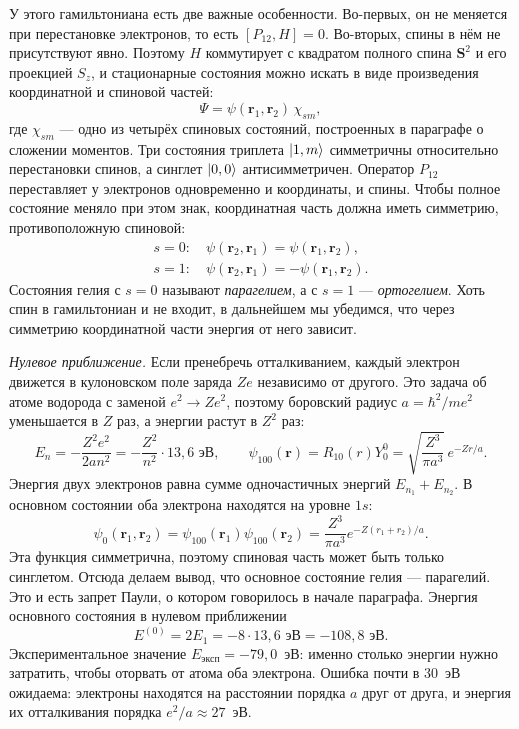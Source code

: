 У этого гамильтониана есть две важные особенности. Во-первых, он не меняется
при перестановке электронов, то есть $[P_{12}, H] = 0$. Во-вторых, спины в нём
не присутствуют явно. Поэтому $H$ коммутирует с квадратом полного спина
$\mathbf{S}^2$ и его проекцией $S_z$, и стационарные состояния можно искать в
виде произведения координатной и спиновой частей:
\[
  \Psi = \psi(\mathbf{r}_1, \mathbf{r}_2)\,\chi_{sm},
\]
где $\chi_{sm}$ --- одно из четырёх спиновых состояний, построенных в параграфе
о сложении моментов. Три состояния триплета $\lvert1, m\rangle$ симметричны
относительно перестановки спинов, а синглет $\lvert0, 0\rangle$ антисимметричен.
Оператор $P_{12}$ переставляет у электронов одновременно и координаты, и спины.
Чтобы полное состояние меняло при этом знак, координатная часть должна иметь
симметрию, противоположную спиновой:
\begin{gather*}
  s = 0:\quad \psi(\mathbf{r}_2, \mathbf{r}_1) = \psi(\mathbf{r}_1, \mathbf{r}_2),\\
  s = 1:\quad \psi(\mathbf{r}_2, \mathbf{r}_1) = -\psi(\mathbf{r}_1, \mathbf{r}_2).
\end{gather*}
Состояния гелия с $s = 0$ называют \textit{парагелием}, а с $s = 1$ ---
\textit{ортогелием}. Хоть спин в гамильтониан и не входит, в дальнейшем мы
убедимся, что через симметрию координатной части энергия от него зависит.

\textit{Нулевое приближение.} Если пренебречь отталкиванием, каждый электрон
движется в кулоновском поле заряда $Ze$ независимо от другого. Это задача об
атоме водорода с заменой $e^2 \to Ze^2$, поэтому боровский радиус $a =
  \hbar^2/me^2$ уменьшается в $Z$ раз, а энергии растут в $Z^2$ раз:
\[
  E_n = -\frac{Z^2e^2}{2an^2} = -\frac{Z^2}{n^2}\cdot 13{,}6\text{~эВ},\qquad
  \psi_{100}(\mathbf{r}) = R_{10}(r)Y^0_0 = \sqrt{\frac{Z^3}{\pi a^3}}\,e^{-Zr/a}.
\]
Энергия двух электронов равна сумме одночастичных энергий $E_{n_1} + E_{n_2}$.
В основном состоянии оба электрона находятся на уровне $1s$:
\[
  \psi_0(\mathbf{r}_1, \mathbf{r}_2) = \psi_{100}(\mathbf{r}_1)\psi_{100}(\mathbf{r}_2)
  = \frac{Z^3}{\pi a^3}e^{-Z(r_1 + r_2)/a}.
\]
Эта функция симметрична, поэтому спиновая часть может быть только синглетом.
Отсюда делаем вывод, что основное состояние гелия --- парагелий. Это и есть
запрет Паули, о котором говорилось в начале параграфа. Энергия основного
состояния в нулевом приближении
\[
  E^{(0)} = 2E_1 = -8\cdot 13{,}6\text{~эВ} = -108{,}8\text{~эВ}.
\]
Экспериментальное значение $E_{\text{эксп}} = -79{,}0$~эВ: именно столько
энергии нужно затратить, чтобы оторвать от атома оба электрона. Ошибка почти в
30~эВ ожидаема: электроны находятся на расстоянии порядка $a$ друг от друга, и
энергия их отталкивания порядка $e^2/a \approx 27$~эВ.

